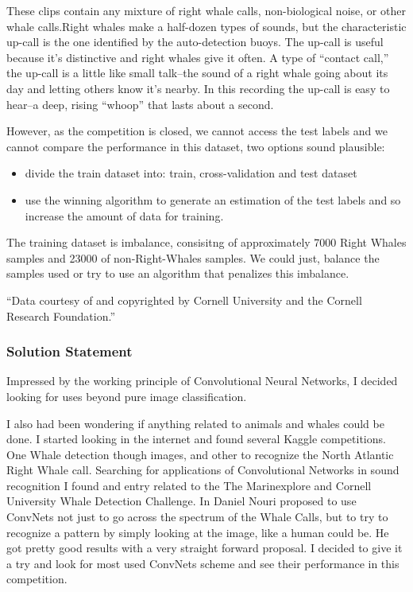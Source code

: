 \documentclass[]{article}
\newcommand{\competition}{The Marinexplore and Cornell University Whale Detection Challenge}
\begin{document}
These clips contain any mixture of right whale calls, non-biological noise, or other whale calls.Right whales make a half-dozen types of sounds, but the characteristic up-call is the one identified by the auto-detection buoys. The up-call is useful because it’s distinctive and right whales give it often. A type of “contact call,” the up-call is a little like small talk--the sound of a right whale going about its day and letting others know it’s nearby. In this recording the up-call is easy to hear--a deep, rising “whoop” that lasts about a second.


However, as the competition is closed, we cannot access the test labels and we cannot compare the performance in this dataset, two options sound plausible:
\begin{itemize}
	\item divide the train dataset into: train, cross-validation and test dataset
	\item use the winning algorithm to generate an estimation of the test labels and so increase the amount of data for training.
\end{itemize}

The training dataset is imbalance, consisitng of approximately 7000 Right Whales samples and 23000 of non-Right-Whales samples. We could just, balance the samples used or try to use an algorithm that penalizes this imbalance.

“Data courtesy of and copyrighted by Cornell University and the Cornell Research Foundation.”

\subsubsection{Solution Statement}\label{solution-statement}
Impressed by the working principle of Convolutional Neural Networks, I decided looking for uses beyond pure image classification. 

I also had been wondering if anything related to animals and whales could be done. I started looking in the internet and found several Kaggle competitions. One Whale detection though images, and other to recognize the North Atlantic Right Whale call. Searching for applications of Convolutional Networks in sound recognition I found and entry related to the \competition. In \cite{Nouriblog} Daniel Nouri proposed to use ConvNets not just to go across the spectrum of the Whale Calls, but to try to recognize a pattern by simply looking at the image, like a human could be. He got pretty good results with a very straight forward proposal. I decided to give it a try and look for most used ConvNets scheme and see their performance in this competition.
\end{document}
